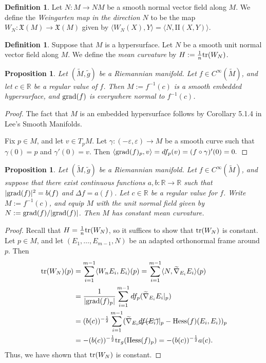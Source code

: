 \documentclass{amsart}[]
\newcommand{\R}{\mathbb R}
\newcommand{\grad}{\text{\normalfont grad}}
\newcommand{\hess}{\text{\normalfont Hess}}
\newcommand{\tr}{\text{\normalfont tr}}
\theoremstyle{plain}
\newtheorem{proposition}[theorem]{Proposition}
\theoremstyle{definition}
\newtheorem{definition}[theorem]{Definition}
\theoremstyle{remark}
\begin{document}
 
 	\begin{definition}
 		Let $N:M \rightarrow NM$ be a smooth normal vector field along $M$. We define the \emph{Weingarten map in the direction $N$} to be the map $W_N: \mathfrak X(M) \rightarrow \mathfrak X(M)$ given by 
 		$\langle W_N(X),Y \rangle = \langle N, \mathrm{II}(X,Y) \rangle.$
 	\end{definition}
 
 	\begin{definition}
 		Suppose that $M$ is a hypersurface. Let $N$ be a smooth unit normal vector field along $M$. We define the \emph{mean curvature} by $H := \frac1n \tr(W_N)$.
 	\end{definition}
 
 	\begin{proposition}
 		Let $(\widetilde M, \widetilde g)$ be a Riemannian manifold. Let $f \in C^\infty(\widetilde M)$, and let $c \in \R$ be a regular value of $f$. Then $M := f^{-1}(c)$ is a smooth embedded hypersurface, and $\grad(f)$ is everywhere normal to $f^{-1}(c)$.
 	\end{proposition}
 	\begin{proof}
 		The fact that $M$ is an embedded hypersurface follows by Corollary 5.1.4 in Lee's Smooth Manifolds. 
 		
 		Fix $p \in M$, and let $v \in T_p M$. Let $\gamma:(-\varepsilon,\varepsilon)\rightarrow M$ be a smooth curve such that $\gamma(0) = p$ and $\gamma'(0) = v$. Then 
 		$\langle \grad(f)_p, v \rangle  = df_p(v) = (f \circ \gamma)'(0) = 0.$
 	\end{proof}
	
	\begin{proposition}
		Let $(\widetilde M, \widetilde g)$ be a Riemannian manifold.  Let $f \in C^\infty(\widetilde M)$, and suppose that there exist continuous functions $a,b:\R \rightarrow \R$ such that $|\grad(f)|^2 = b(f)$ and $\Delta f = a(f)$. Let $c \in \R$ be a regular value for $f$. Write $M := f^{-1}(c)$, and equip $M$ with the unit normal field given by $N := \grad(f)/|\grad(f)|$. Then $M$ has constant mean curvature.
	\end{proposition}
	\begin{proof}
		Recall that $H = \frac1n \tr(W_N)$, so it suffices to show that $\tr(W_N)$ is constant. Let $p \in M$, and let $(E_1,\ldots,E_{m-1}, N)$ be an adapted orthonormal frame around $p$. Then
		\begin{align*}
			\tr(W_N)(p) &= \sum_{i=1}^{m-1} \langle W_n E_i, E_i \rangle(p) = \sum_{i=1}^{m-1} \langle N, \widetilde \nabla_{E_i} E_i \rangle(p) \\
			&= 
			\frac{1}{|\grad(f)_p|}  \sum_{i=1}^{m-1} df_p(\widetilde \nabla_{E_i} E_i|_p)\\
			& = 
			(b(c))^{-\frac12} \sum_{i=1}^{m-1}( \widetilde \nabla_{E_i} \cancel{df(E_i)}|_p - \hess(f)(E_i, E_i))_p \\
			&= - (b(c))^{-\frac12} \tr_g(\hess(f)_p) = -(b(c))^{-\frac12}  a(c). 
		\end{align*}
		Thus, we have shown that $\tr(W_N)$ is constant.
	\end{proof}
\end{document}
